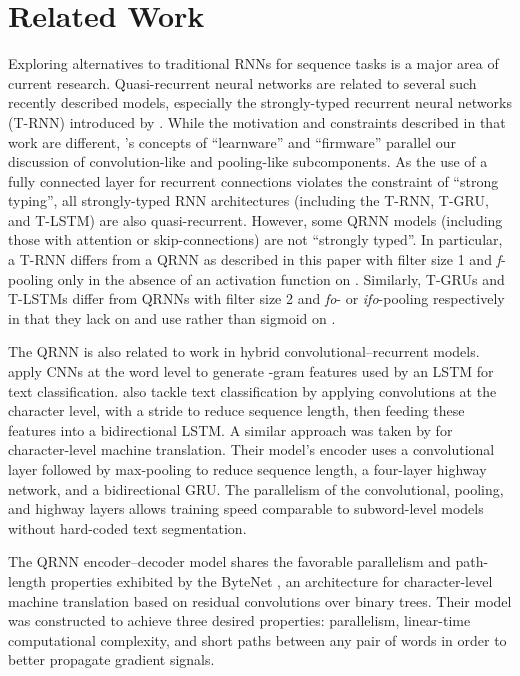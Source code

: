 \documentclass{article} \usepackage{iclr2017_conference,times}
\begin{document}
\section{Related Work}

Exploring alternatives to traditional RNNs for sequence tasks is a major area of current research. Quasi-recurrent neural networks are related to several such recently described models, especially the strongly-typed recurrent neural networks (T-RNN) introduced by \cite{Balduzzi2016}. While the motivation and constraints described in that work are different, \cite{Balduzzi2016}'s concepts of ``learnware'' and ``firmware'' parallel our discussion of convolution-like and pooling-like subcomponents. As the use of a fully connected layer for recurrent connections violates the constraint of ``strong typing'', all strongly-typed RNN architectures (including the T-RNN, T-GRU, and T-LSTM) are also quasi-recurrent. However, some QRNN models (including those with attention or skip-connections) are not ``strongly typed''. In particular, a T-RNN differs from a QRNN as described in this paper with filter size 1 and \emph{f}-pooling only in the absence of an activation function on . Similarly, T-GRUs and T-LSTMs differ from QRNNs with filter size 2 and \emph{fo}- or \emph{ifo}-pooling respectively in that they lack  on  and use  rather than sigmoid on .

The QRNN is also related to work in hybrid convolutional--recurrent models. \citet{Zhou2015b} apply CNNs at the word level to generate -gram features used by an LSTM for text classification. \citet{Xiao2016} also tackle text classification by applying convolutions at the character level, with a stride to reduce sequence length, then feeding these features into a bidirectional LSTM. A similar approach was taken by \citet{Lee2016} for character-level machine translation. Their model's encoder uses a convolutional layer followed by max-pooling to reduce sequence length, a four-layer highway network, and a bidirectional GRU.
The parallelism of the convolutional, pooling, and highway layers allows training speed comparable to subword-level models without hard-coded text segmentation.

The QRNN encoder--decoder model shares the favorable parallelism and path-length properties exhibited by the ByteNet \citep{Kalchbrenner2016}, an architecture for character-level machine translation based on residual convolutions over binary trees. Their model was constructed to achieve three desired properties: parallelism, linear-time computational complexity, and short paths between any pair of words in order to better propagate gradient signals.
\end{document}
